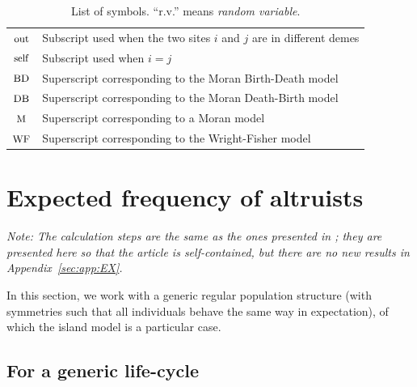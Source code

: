 \documentclass[11pt, letterpaper]{article}
\newcommand{\appname}[0]{Appendix}
\newcommand{\Moran}{\textrm{M}}
\newcommand{\BD}{\textrm{BD}}
\newcommand{\DB}{\textrm{DB}}
\newcommand{\WF}{\textrm{WF}}
\newcommand{\self}{\textrm{self}}
\newcommand{\out}{\textrm{out}}
\begin{document}
\begin{table}[h!]
\begin{tabular}{>{$}c<{$} l}
\small{\out} & Subscript used when the two sites $i$ and $j$ are in different demes\\
\small{\self} & Subscript used when $i=j$\\
\hline
\small{\BD} & Superscript corresponding to the Moran Birth-Death model\\
\small{\DB} & Superscript corresponding to the Moran Death-Birth model\\
\small{\Moran} & Superscript corresponding to a Moran model\\
\small{\WF} & Superscript corresponding to the Wright-Fisher model
\end{tabular}
\caption{List of symbols. ``r.v.'' means \textit{random variable}. }
\label{tab:symbols}
\end{table}
\clearpage

\appendix
 
\renewcommand{\theequation}{\thesection.\arabic{equation}}
\setcounter{equation}{0}  %
 
%
\begin{center}
{\color{seccol}{\LARGE \bfseries \appname}}
\end{center}

\pagestyle{appendix}
\singlespace


\section{Expected frequency of altruists\label{sec:app:EX}}

\textit{Note: The calculation steps are the same as the ones presented in \citet{Debarre2017}; they are presented here so that the article is self-contained, but there are no new results in \appname~\ref{sec:app:EX}. }

In this section, we work with a generic regular population structure (with symmetries such that all individuals behave the same way in expectation), of which the island model is a particular case. 

\subsection{For a generic life-cycle \label{sec:app:generic}}
\end{document}
